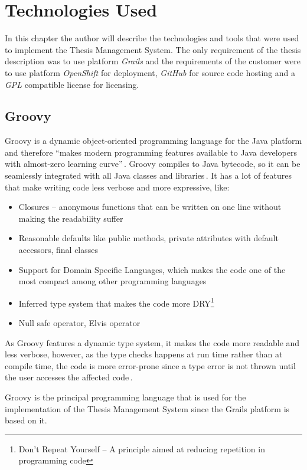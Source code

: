 \chapter{Technologies Used}

In this chapter the author will describe the technologies and tools that were used to implement the Thesis Management System. The only requirement of the thesis description was to use platform \emph{Grails} and the requirements of the customer were to use platform \emph{OpenShift} for deployment, \emph{GitHub} for source code hosting and a \emph{GPL} compatible license for licensing.

\section{Groovy}

Groovy is a dynamic object-oriented programming language for the Java platform and therefore ``makes modern programming features available to Java developers with almost-zero learning curve''\,\cite{groovy-homepage}. Groovy compiles to Java bytecode, so it can be seamlessly integrated with all Java classes and libraries\,\cite{groovy-homepage}. It has a lot of features that make writing code less verbose and more expressive, like:

\begin{itemize}
    \item Closures -- anonymous functions that can be written on one line without making the readability suffer
    \item Reasonable defaults like public methods, private attributes with default accessors, final classes
    \item Support for Domain Specific Languages, which makes the code one of the most compact among other programming languages
    \item Inferred type system that makes the code more DRY\footnote{Don't Repeat Yourself -- A principle aimed at reducing repetition in programming code}
    \item Null safe operator, Elvis operator
\end{itemize}

As Groovy features a dynamic type system, it makes the code more readable and less verbose, however, as the type checks happens at run time rather than at compile time, the code is more error-prone since a type error is not thrown until the user accesses the affected code\,\cite{groovy-in-action}.

Groovy is the principal programming language that is used for the implementation of the Thesis Management System since the Grails platform is based on it.

